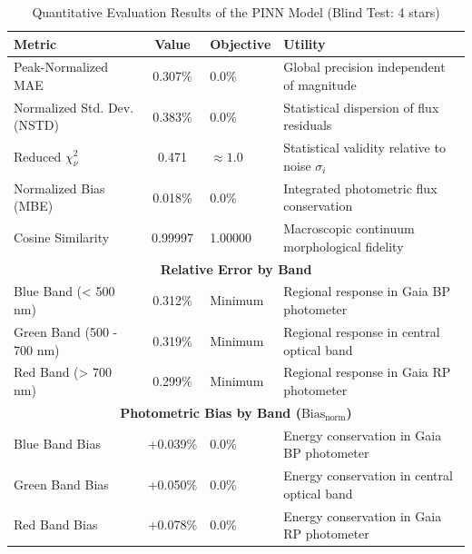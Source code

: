 
\begin{table}[htpb]
\centering
\caption{Quantitative Evaluation Results of the PINN Model (Blind Test: 4 stars)}
\label{tab:pinn_evaluation}
\begin{tabular}{lcll}
\hline
\textbf{Metric} & \textbf{Value} & \textbf{Objective} & \textbf{Utility} \\
\hline
Peak-Normalized MAE & 0.307\% & 0.0\% & Global precision independent of magnitude \\
Normalized Std. Dev. (NSTD) & 0.383\% & 0.0\% & Statistical dispersion of flux residuals \\
Reduced $\chi^2_\nu$ & 0.471 & $\approx 1.0$ & Statistical validity relative to noise $\sigma_i$ \\
Normalized Bias (MBE) & 0.018\% & 0.0\% & Integrated photometric flux conservation \\
Cosine Similarity & 0.99997 & 1.00000 & Macroscopic continuum morphological fidelity \\
\hline
\multicolumn{4}{c}{\textbf{Relative Error by Band}} \\
\hline
Blue Band (< 500 nm) & 0.312\% & Minimum & Regional response in Gaia BP photometer \\
Green Band (500 - 700 nm) & 0.319\% & Minimum & Regional response in central optical band \\
Red Band (> 700 nm) & 0.299\% & Minimum & Regional response in Gaia RP photometer \\
\hline
\multicolumn{4}{c}{\textbf{Photometric Bias by Band ($\text{Bias}_{\text{norm}}$)}} \\
\hline
Blue Band Bias & +0.039\% & 0.0\% & Energy conservation in Gaia BP photometer \\
Green Band Bias & +0.050\% & 0.0\% & Energy conservation in central optical band \\
Red Band Bias & +0.078\% & 0.0\% & Energy conservation in Gaia RP photometer \\
\hline
\end{tabular}
\end{table}
